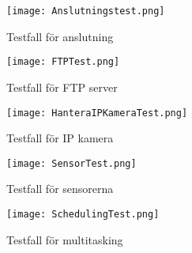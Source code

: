 \begin{figure}[h]
  \texttt{[image: Anslutningstest.png]}
  \caption{Testfall för anslutning}
  \label{fig:Anslutningstest}
\end{figure}

\begin{figure}[h]
  \texttt{[image: FTPTest.png]}
  \caption{Testfall för FTP server}
  \label{fig:FTPTest}
\end{figure}

\begin{figure}[h]
  \texttt{[image: HanteraIPKameraTest.png]}
  \caption{Testfall för IP kamera}
  \label{fig:HanteraIPKameraTest}
\end{figure}

\begin{figure}[h]
  \texttt{[image: SensorTest.png]}
  \caption{Testfall för sensorerna}
  \label{fig:SensorTest}
\end{figure}

\begin{figure}[h]
  \texttt{[image: SchedulingTest.png]}
  \caption{Testfall för multitasking}
  \label{fig:SchedulingTest}
\end{figure}




